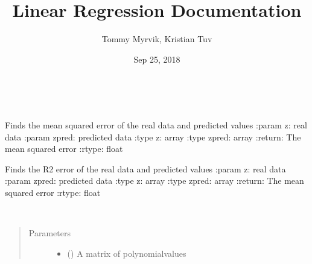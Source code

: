\documentclass[letterpaper,10pt,english]{sphinxmanual}
\title{Linear Regression Documentation}
\date{Sep 25, 2018}
\author{Tommy Myrvik, Kristian Tuv}
\begin{document}
\maketitle
\sphinxtableofcontents
{}\label{\detokenize{index::doc}}

\label{\detokenize{index:module-cls_reg}}

\begin{fulllineitems}
\label{\detokenize{index:cls_reg.LinReg}}~

\begin{fulllineitems}
\label{\detokenize{index:cls_reg.LinReg.MSE}}
Finds the mean squared error of the real data and predicted values
:param z: real data
:param zpred: predicted data
:type z: array
:type zpred: array
:return: The mean squared error
:rtype: float

\end{fulllineitems}


\begin{fulllineitems}
\label{\detokenize{index:cls_reg.LinReg.R2}}
Finds the R2 error of the real data and predicted values
:param z: real data
:param zpred: predicted data
:type z: array
:type zpred: array
:return: The mean squared error
:rtype: float

\end{fulllineitems}


\begin{fulllineitems}
\label{\detokenize{index:cls_reg.LinReg.__init__}}~\begin{quote}\begin{description}
\item[{Parameters}] \leavevmode\begin{itemize}
\item {} 
 () \textendash{} A matrix of polynomialvalues


\end{itemize}
\end{description}
\end{quote}
\end{fulllineitems}
\end{fulllineitems}
\end{document}
